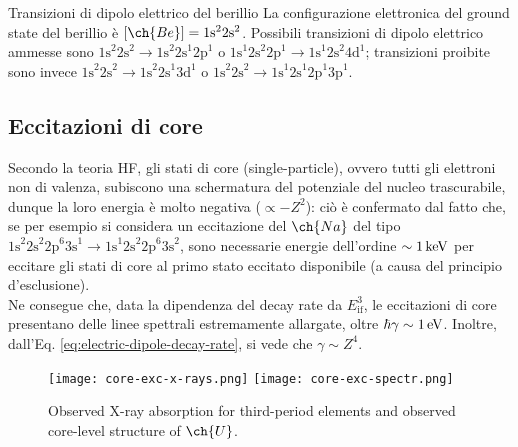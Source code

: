 \begin{example}{Transizioni di dipolo elettrico del berillio}{}
	La configurazione elettronica del ground state del berillio è $ [\ch{Be}] = \text{1s}^2 \text{2s}^2 $. Possibili transizioni di dipolo elettrico ammesse sono $ \text{1s}^2 \text{2s}^2 \rightarrow \text{1s}^2 \text{2s}^1 \text{2p}^1 $ o $ \text{1s}^1 \text{2s}^2 \text{2p}^1 \rightarrow \text{1s}^1 \text{2s}^2 \text{4d}^1 $; transizioni proibite sono invece $ \text{1s}^2 \text{2s}^2 \rightarrow \text{1s}^2 \text{2s}^1 \text{3d}^1 $ o $ \text{1s}^2 \text{2s}^2 \rightarrow \text{1s}^1 \text{2s}^1 \text{2p}^1 \text{3p}^1 $.
\end{example}

\subsection{Eccitazioni di core}

Secondo la teoria HF, gli stati di core (single-particle), ovvero tutti gli elettroni non di valenza, subiscono una schermatura del potenziale del nucleo trascurabile, dunque la loro energia è molto negativa ($ \propto - Z^2 $): ciò è confermato dal fatto che, se per esempio si considera un eccitazione del $ \ch{Na} $ del tipo $ \text{1s}^2 \text{2s}^2 \text{2p}^6 \text{3s}^1 \rightarrow \text{1s}^1 \text{2s}^2 \text{2p}^6 \text{3s}^2 $, sono necessarie energie dell'ordine $ \sim 1\,\mathrm{keV} $ per eccitare gli stati di core al primo stato eccitato disponibile (a causa del principio d'esclusione). \\
Ne consegue che, data la dipendenza del decay rate da $ E_\text{if}^3 $, le eccitazioni di core presentano delle linee spettrali estremamente allargate, oltre $ \hbar \gamma \sim 1\,\mathrm{eV} $. Inoltre, dall'Eq. \ref{eq:electric-dipole-decay-rate}, si vede che $ \gamma \sim Z^4 $.

\begin{figure}
	\centering
	\texttt{[image: core-exc-x-rays.png]}
	\texttt{[image: core-exc-spectr.png]}
	\caption{Observed X-ray absorption for third-period elements and observed core-level structure of $ \ch{U} $.}
	\label{core-exc}
\end{figure}

